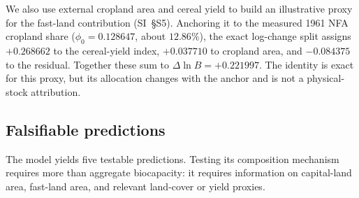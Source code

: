 \documentclass[preprint,12pt,authoryear]{elsarticle}
\begin{document}
\begin{samepage}
We also use external cropland area and cereal yield to build an illustrative proxy for the fast-land contribution (SI~\S S5). Anchoring it to the measured 1961 NFA cropland share ($\phi_0=0.128647$, about $12.86\%$), the exact log-change split assigns $+0.268662$ to the cereal-yield index, $+0.037710$ to cropland area, and $-0.084375$ to the residual. Together these sum to $\Delta\ln B=+0.221997$. The identity is exact for this proxy, but its allocation changes with the anchor and is not a physical-stock attribution.\par
\end{samepage}

\begin{samepage}
\subsection{Falsifiable predictions}\label{sec:predictions}

The model yields five testable predictions. Testing its composition mechanism requires more than aggregate biocapacity: it requires information on capital-land area, fast-land area, and relevant land-cover or yield proxies.\par
\end{samepage}
\end{document}
